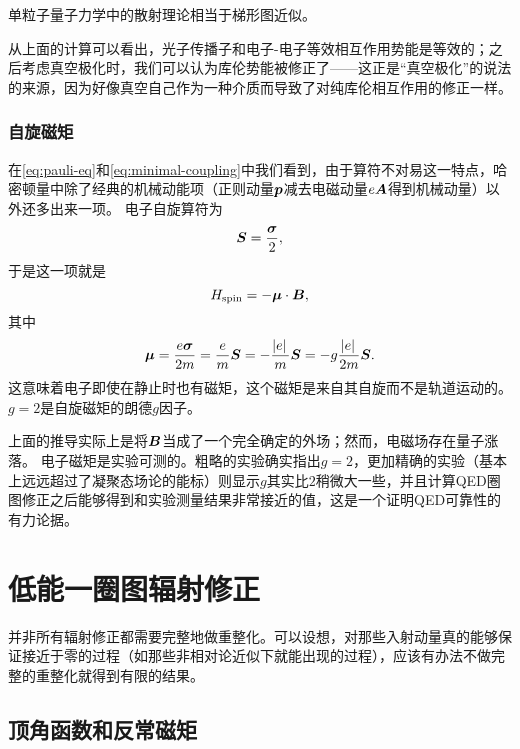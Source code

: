 \documentclass[hyperref, UTF8, a4paper]{ctexart}
\begin{document}
单粒子量子力学中的散射理论相当于梯形图近似。

从上面的计算可以看出，光子传播子和电子-电子等效相互作用势能是等效的；之后考虑真空极化时，我们可以认为库伦势能被修正了——这正是“真空极化”的说法的来源，因为好像真空自己作为一种介质而导致了对纯库伦相互作用的修正一样。

\subsubsection{自旋磁矩}\label{sec:spin-magnetic-moment}

在\eqref{eq:pauli-eq}和\eqref{eq:minimal-coupling}中我们看到，由于算符不对易这一特点，哈密顿量中除了经典的机械动能项（正则动量$\vb*{p}$减去电磁动量$e \vb*{A}$得到机械动量）以外还多出来一项。
电子自旋算符为
\[
    \vb*{S} = \frac{\vb*{\sigma}}{2},
\]
于是这一项就是
\begin{equation}
    H_\text{spin} = - \vb*{\mu} \cdot \vb*{B}, 
\end{equation}
其中
\begin{equation}
    \vb*{\mu} = \frac{e \vb*{\sigma}}{2m} = \frac{e}{m} \vb*{S} = - \frac{\abs*{e}}{m} \vb*{S} = - g \frac{\abs*{e}}{2m} \vb*{S}.
\end{equation}
这意味着电子即使在静止时也有磁矩，这个磁矩是来自其自旋而不是轨道运动的。$g=2$是自旋磁矩的朗德$g$因子。

上面的推导实际上是将$\vb*{B}$当成了一个完全确定的外场；然而，电磁场存在量子涨落。
电子磁矩是实验可测的。粗略的实验确实指出$g=2$，更加精确的实验（基本上远远超过了凝聚态场论的能标）则显示$g$其实比$2$稍微大一些，并且计算QED圈图修正之后能够得到和实验测量结果非常接近的值，这是一个证明QED可靠性的有力论据。

\section{低能一圈图辐射修正}

并非所有辐射修正都需要完整地做重整化。可以设想，对那些入射动量真的能够保证接近于零的过程（如那些非相对论近似下就能出现的过程），应该有办法不做完整的重整化就得到有限的结果。

\subsection{顶角函数和反常磁矩}\label{sec:abnormal-magnetic}
\end{document}
